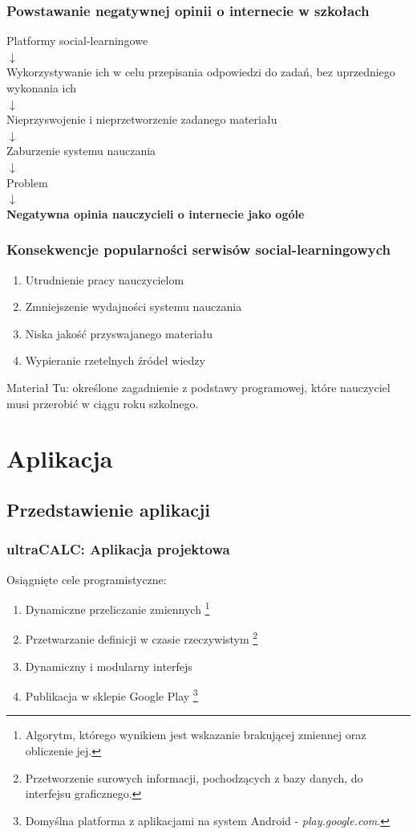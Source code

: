 \documentclass[10pt]{beamer}
\begin{document}
\begin{frame}
  \frametitle{Powstawanie negatywnej opinii o internecie w szkołach}
  \large
  \centering
  Platformy social-learningowe \\
  $\downarrow$ \\
  Wykorzystywanie ich w celu przepisania odpowiedzi do zadań, bez uprzedniego wykonania ich \\
  $\downarrow$ \\
  Nieprzyswojenie i nieprzetworzenie zadanego materiału \\
  $\downarrow$ \\
  Zaburzenie systemu nauczania \\
  $\downarrow$ \\
  Problem \\
  $\downarrow$ \\
  \textbf{Negatywna opinia nauczycieli o internecie jako ogóle}

\end{frame}

\begin{frame}
  \frametitle{Konsekwencje popularności serwisów social-learningowych}
  \begin{enumerate}
    \item Utrudnienie pracy nauczycielom
    \item Zmniejszenie wydajności systemu nauczania
    \item Niska jakość przyswajanego materiału
    \item Wypieranie rzetelnych źródeł wiedzy
  \end{enumerate}
  \begin{block}{Materiał}
    Tu: określone zagadnienie z podstawy programowej, które nauczyciel musi przerobić w ciągu roku szkolnego.
  \end{block}
\end{frame}

\section{Aplikacja}
\subsection{Przedstawienie aplikacji}

\begin{frame}
  \frametitle{ultraCALC: Aplikacja projektowa}
  Osiągnięte cele programistyczne:
  \begin{enumerate}
    \item Dynamiczne przeliczanie zmiennych \footnote[frame]{Algorytm, którego wynikiem jest wskazanie brakującej zmiennej oraz obliczenie jej.}
    \item Przetwarzanie definicji w czasie rzeczywistym \footnote[frame]{Przetworzenie surowych informacji, pochodzących z bazy danych, do interfejsu graficznego.}
    \item Dynamiczny i modularny interfejs
    \item Publikacja w sklepie Google Play \footnote[frame]{Domyślna platforma z aplikacjami na system Android -  \emph{play.google.com}.}
  \end{enumerate}
\end{frame}
\end{document}
